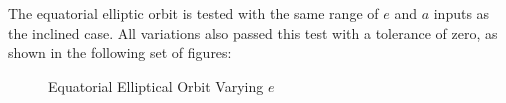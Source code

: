 \begin{itemize}
\begin{enumerate}
		The equatorial elliptic orbit is tested with the same range of $e$ and $a$ inputs as the inclined case. All variations also passed this test with a tolerance of zero, as shown in the following set of figures:
		\begin{figure}[H] \label{fig:4}
			\centering
			\caption{Equatorial Elliptical Orbit Varying $e$}
		\end{figure}
		\begin{figure}[H] \label{fig:5}
			\centering

\end{figure}
\end{enumerate}
\end{itemize}
